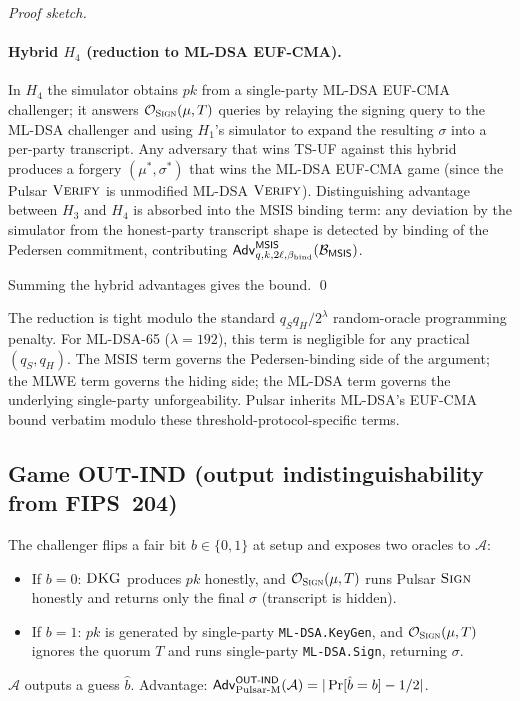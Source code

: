 \begin{proof}[Proof sketch]
\paragraph{Hybrid $H_4$ (reduction to ML-DSA EUF-CMA).} In $H_4$ the
simulator obtains $\mathit{pk}$ from a single-party ML-DSA EUF-CMA
challenger; it answers $\mathcal{O}_{\textsc{Sign}}(\mu, T)$ queries by
relaying the signing query to the ML-DSA challenger and using $H_1$'s
simulator to expand the resulting $\sigma$ into a per-party
transcript. Any adversary that wins TS-UF against this hybrid
produces a forgery $(\mu^*, \sigma^*)$ that wins the ML-DSA EUF-CMA
game (since the Pulsar $\textsc{Verify}$ is unmodified ML-DSA
$\textsc{Verify}$). Distinguishing advantage between $H_3$ and $H_4$ is
absorbed into the MSIS binding term: any deviation by the simulator
from the honest-party transcript shape is detected by binding of the
Pedersen commitment, contributing
$\mathsf{Adv}^{\mathsf{MSIS}}_{q, k, 2\ell, \beta_{\mathrm{bind}}}(\mathcal{B}_{\mathsf{MSIS}})$.

Summing the hybrid advantages gives the bound. \qed
\end{proof}

\begin{remark}[Tightness]
The reduction is tight modulo the standard $q_S q_H / 2^\lambda$
random-oracle programming penalty. For ML-DSA-65 ($\lambda = 192$),
this term is negligible for any practical $(q_S, q_H)$. The MSIS
term governs the Pedersen-binding side of the argument; the MLWE
term governs the hiding side; the ML-DSA term governs the underlying
single-party unforgeability. Pulsar inherits ML-DSA's EUF-CMA
bound verbatim modulo these threshold-protocol-specific terms.
\end{remark}

\subsection{Game OUT-IND (output indistinguishability from FIPS~204)}
\label{sec:game-outind}

\begin{game}
\label{game:outind}
The challenger flips a fair bit $b \in \{0, 1\}$ at setup and exposes
two oracles to $\mathcal{A}$:
\begin{itemize}[leftmargin=*, itemsep=0pt]
\item If $b = 0$: $\textsc{DKG}$ produces $\mathit{pk}$ honestly, and
$\mathcal{O}_{\textsc{Sign}}(\mu, T)$ runs Pulsar $\textsc{Sign}$ honestly and
returns only the final $\sigma$ (transcript is hidden).
\item If $b = 1$: $\mathit{pk}$ is generated by single-party
\texttt{ML-DSA.KeyGen}, and $\mathcal{O}_{\textsc{Sign}}(\mu, T)$ ignores the
quorum $T$ and runs single-party \texttt{ML-DSA.Sign}, returning
$\sigma$.
\end{itemize}
$\mathcal{A}$ outputs a guess $\hat b$. Advantage:
$\mathsf{Adv}^{\mathsf{OUT\textsf{-}IND}}_{\mathrm{Pulsar\text{-}M}}(\mathcal{A})
= |\Pr[\hat b = b] - 1/2|$.
\end{game}

